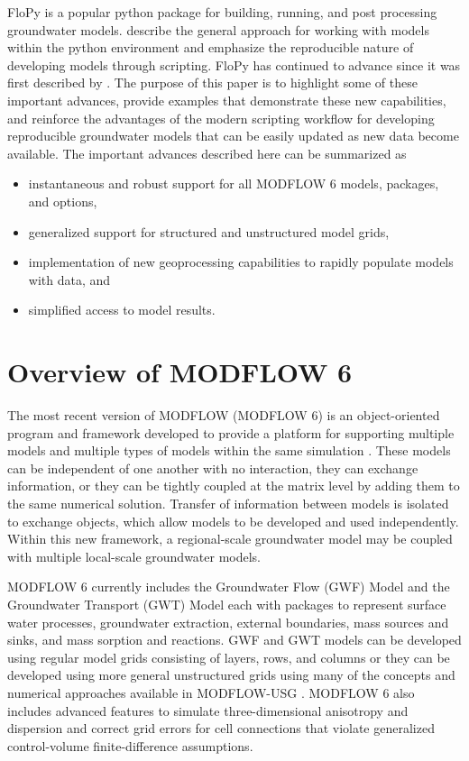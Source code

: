 \documentclass[utf8]{frontiersSCNS} %
\begin{document}
FloPy is a popular python package for building, running, and post processing groundwater models.  \cite{bakker2016scripting} describe the general approach for working with models within the python environment and emphasize the reproducible nature of developing models through scripting.  FloPy has continued to advance since it was first described by \cite{bakker2016scripting}.  The purpose of this paper is to highlight some of these important advances, provide examples that demonstrate these new capabilities, and reinforce the advantages of the modern scripting workflow for developing reproducible groundwater models that can be easily updated as new data become available.  The important advances described here can be summarized as

\begin{itemize}
\item instantaneous and robust support for all MODFLOW 6 models, packages, and options,
\item generalized support for structured and unstructured model grids,
\item implementation of new geoprocessing capabilities to rapidly populate models with data, and
\item simplified access to model results.
\end{itemize}

\section{Overview of MODFLOW 6}

The most recent version of MODFLOW (MODFLOW 6) is an object-oriented program and framework developed to provide a platform for supporting multiple models and multiple types of models within the same simulation \citep{modflow6gwf, modflow6framework}. These models can be independent of one another with no interaction, they can exchange information, or they can be tightly coupled at the matrix level by adding them to the same numerical solution. Transfer of information between models is isolated to exchange objects, which allow models to be developed and used independently. Within this new framework, a regional-scale groundwater model may be coupled with multiple local-scale groundwater models. 

MODFLOW 6 currently includes the Groundwater Flow (GWF) Model and the Groundwater Transport (GWT) Model each with packages to represent surface water processes,  groundwater extraction, external boundaries, mass sources and sinks, and mass sorption and reactions.  GWF and GWT models can be developed using regular model grids consisting of layers, rows, and columns or they can be developed using more general unstructured grids using many of the concepts and numerical approaches available in MODFLOW-USG  \citep{modflowusg}.  MODFLOW 6 also includes advanced features to simulate three-dimensional anisotropy and dispersion \citep{modflow6xt3d} and correct grid errors for cell connections that violate generalized control-volume finite-difference assumptions.
\end{document}
